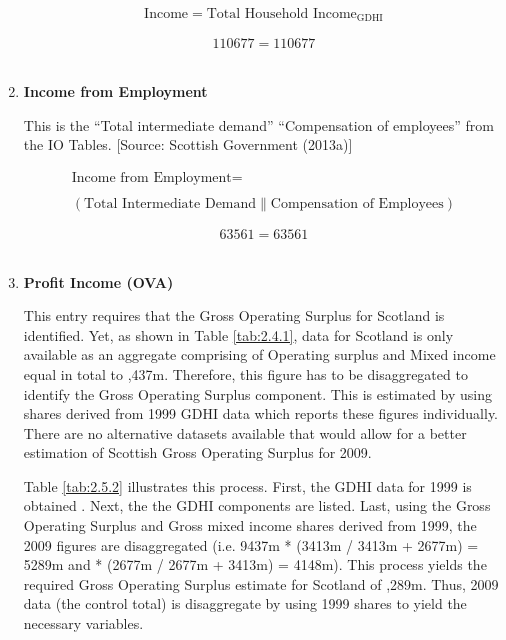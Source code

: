 \begin{enumerate}
\begin{equation}
\begin{split}
\text{Income} =
\text{Total Household Income}_\text{GDHI}
\end{split} \label{eq:2.5.1}
\end{equation}

\begin{equation} \nonumber
110677 = 110677
\end{equation}\\

\item \textbf {Income from Employment}

This is the ``Total intermediate demand'' \text{|| }``Compensation of employees'' from the IO Tables. [Source: Scottish Government (2013a)] \cite{ScottishGovernment2013a}

\begin{equation}
\begin{split}
\text{Income from Employment} =  \\ \\
(\text{Total Intermediate Demand}\|\text{Compensation of Employees})
\end{split} \label{eq:2.5.2}
\end{equation}

\begin{equation} \nonumber
63561 = 63561
\end{equation}\\


\item \textbf {Profit Income (OVA)}

\bigskip

This entry requires that the Gross Operating Surplus for Scotland is identified. Yet, as shown in Table \ref{tab:2.4.1}, data for Scotland is only available as an aggregate comprising of Operating surplus and Mixed income equal in total to ,437m. Therefore, this figure has to be disaggregated to identify the Gross Operating Surplus component. This is estimated by using shares derived from 1999 GDHI data which reports these figures individually. There are no alternative datasets available that would allow for a better estimation of Scottish Gross Operating Surplus for 2009. 

\bigskip

Table \ref{tab:2.5.2} illustrates this process. First, the GDHI data for 1999 is obtained . Next, the the GDHI components are listed. Last, using the Gross Operating Surplus and Gross mixed income shares derived from 1999, the 2009 figures are disaggregated (i.e. \textsterling9437m * (\textsterling3413m / \textsterling3413m + \textsterling2677m) = \textsterling5289m and  * (\textsterling2677m / \textsterling2677m + \textsterling3413m) = \textsterling4148m). This process yields the required Gross Operating Surplus estimate for Scotland of ,289m. Thus, 2009 data (the control total) is disaggregate by using 1999 shares to yield the necessary variables.      


\end{enumerate}
